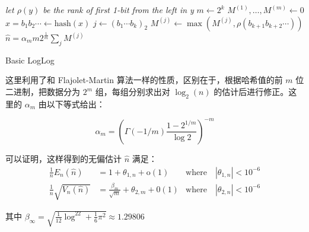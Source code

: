 \documentclass{ctexart}
\begin{document}
    \begin{algorithm}
        \BlankLine
        \emph{let $\rho(y)$ be the rank of first 1-bit from the left in y}\;
        $m \leftarrow 2^k$\;
        $M^{(1)},\ldots ,M^{(m)} \leftarrow 0$\;
         {
            $x = b_1b_2 \cdots \leftarrow \mathrm{hash}(x)$\;
            $j \leftarrow (b_1\cdots b_k)_2$\;
            $M^{(j)} \leftarrow \max(M^{(j)}, \rho(b_{k+1}b_{k+2}\cdots))$\;
        }
        $\hat{n} = \alpha_mm2^{\frac1m}\sum_j{M^{(j)}}$\;
        \caption{Basic LogLog}
    \end{algorithm}

    这里利用了和 Flajolet-Martin 算法一样的性质，区别在于，根据哈希值的前 $m$ 位二进制，把数据分为 $2^m$ 组，每组分别求出对 $\log_2(n)$ 的估计后进行修正。这里的 $\alpha_m$ 由以下等式给出：

    \begin{equation*}
        \alpha_m = (\Gamma(-1/m)\frac{1-2^{1/m}}{\log{2}})^{-m}
    \end{equation*}

    可以证明\cite{Durand:2003je}，这样得到的无偏估计 $\hat{n}$ 满足：
    \begin{align*}
        \frac1nE_n(\hat{n}) &= 1 + \theta_{1,n}+\mathrm{o}(1) & \mathrm{where} \quad |\theta_{1,n}| < 10^{-6} \\
        \frac1n\sqrt{V_n(\hat{n})} &= \frac{\beta_m}{\sqrt{m}} + \theta_{2,m} + \mathrm{0}(1) & \mathrm{where} \quad |\theta_{2,n}| < 10^{-6}
    \end{align*}

    其中 $\beta_{\infty} = \sqrt{\frac1{12}\log^22+\frac16\pi^2} \approx 1.29806$

\printbibliography[title=引用文献]
\end{document}
